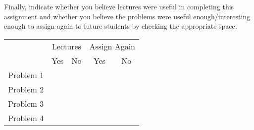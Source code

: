 \documentclass[11pt,letterpaper]{article}
\begin{document}
Finally, indicate whether you believe lectures were useful in completing this assignment and whether you believe the problems were useful enough/interesting enough to assign again to future students by checking the appropriate space.

\vspace{0.25cm}
\begin{center}
\begin{tabular}{c||c|c|c|c|}
  & \multicolumn{2}{c|}{Lectures} &  \multicolumn{2}{c|}{Assign Again} \\ \cline{2-5}
   & Yes & No & Yes & No \\ \hline \hline
  Problem 1 &  &  &  &  \\ \hline 
  Problem 2 &  &  &  &  \\ \hline 
  Problem 3 &  &  &  &  \\ \hline 
  Problem 4 &  &  &  &  \\ \hline 
\end{tabular}
\end{center}
\end{document}
